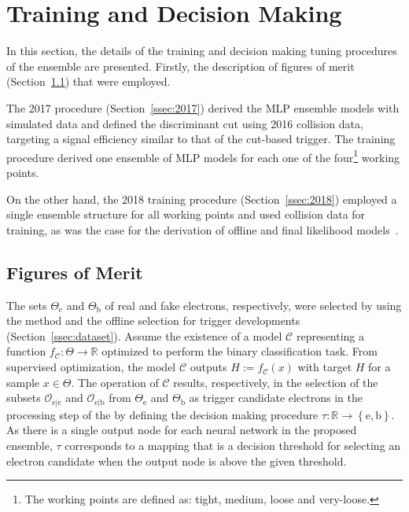 \section{Training and Decision Making}%
\label{sec:tuning}

In this section, the details of the training and decision making tuning procedures
of the \rnn ensemble are presented. Firstly, the description of figures of merit (Section~\ref{ssec:fom}) that were employed.

The 2017 procedure (Section~\ref{ssec:2017}) derived the MLP ensemble
models with simulated data and defined the discriminant cut using
2016 collision data, targeting a signal efficiency similar to that of the cut-based trigger.
The training procedure derived one ensemble of MLP models for each one of the four\footnote{The working points are defined as: tight, medium, loose and very-loose.} working points. 

On the other hand, the 2018 training procedure (Section~\ref{ssec:2018})
employed a single ensemble structure for all working points and used
collision data for training, as was the case for the derivation of offline
and final \hlt likelihood models~\cite{aaboud2019electron}.





\subsection{Figures of Merit}\label{ssec:fom}



The sets $\Theta_{\text{e}}$ and $\Theta_{\text{b}}$ of real and fake electrons, respectively, were selected by using the \tnp{} method and the offline selection for trigger developments (Section~\ref{ssec:dataset}). Assume the existence of a model $\mathcal{C}$ representing a function $f_{\mathcal{C}} : \Theta \rightarrow \mathbb{R}$ optimized to perform the binary classification task.   From supervised optimization, the model $\mathcal{C}$ outputs $\hat{H}:=f_{\mathcal{C}}(x)$ with target $H$ for a sample $x \in \Theta$. The operation of $\mathcal{C}$ results, respectively, in the selection of the subsets $\mathcal{O}_{\text{e}|\text{e}}$ and $\mathcal{O}_{\text{e}|\text{b}}$ from $\Theta_{\text{e}}$ and $\Theta_{\text{b}}$ as trigger candidate electrons in the \fastcalo{} processing step of the \hlt{} by defining the decision making procedure $\tau : \mathbb{R} \rightarrow \left\{\text{e},\text{b}\right\}$. As there is a single output node for each neural network in the proposed \rnn{} ensemble, $\tau$ corresponds to a mapping that is a decision threshold for selecting an electron candidate when the output node is above the given threshold.  



